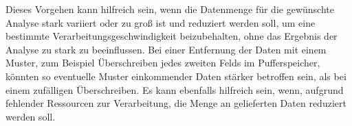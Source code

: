 Dieses Vorgehen kann hilfreich sein, 
wenn die Datenmenge für die gewünschte Analyse stark variiert oder zu groß ist und reduziert werden soll, 
um eine bestimmte Verarbeitungsgeschwindigkeit beizubehalten, 
ohne das Ergebnis der Analyse zu stark zu beeinflussen.
Bei einer Entfernung der Daten mit einem Muster, zum Beispiel Überschreiben jedes zweiten Felds im Pufferspeicher, 
könnten so eventuelle Muster einkommender Daten stärker betroffen sein, als bei einem zufälligen Überschreiben.
Es kann ebenfalls hilfreich sein, 
wenn, aufgrund fehlender Ressourcen zur Verarbeitung, 
die Menge an gelieferten Daten reduziert werden soll.
